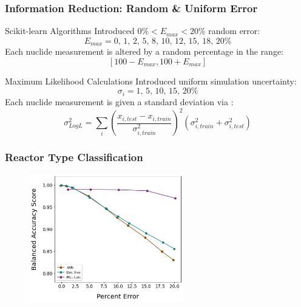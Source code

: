 
\begin{frame}
  \frametitle{Information Reduction: Random \& Uniform Error}
  \begin{block}{Scikit-learn Algorithms}
    \small
    Introduced $0\% < E_{max} < 20\%$ random error:
    \[E_{max} = \text{0, 1, 2, 5, 8, 10, 12, 15, 18, 20}\% \]
    Each nuclide measurement is altered by a random percentage in the range: 
    \[[100-E_{max},100+E_{max}]\]
  \end{block}
  \begin{block}{Maximum Likelihood Calculations}
  \small
    Introduced uniform simulation uncertainty: 
    \[\sigma_i = \text{1, 5, 10, 15, 20}\% \]
    Each nuclide measurement is given a standard deviation via 
    \cite{mll_sensitivity}:
    \[\sigma_{Log L}^2 = \sum_i \left( 
                                \frac{x_{i,test} - x_{i,train}}{\sigma_{i,train}^2}
                                \right)^2 
                                (\sigma_{i,train}^2 + \sigma_{i,test}^2)
    \]
  \end{block}
\end{frame}

\begin{frame}
  \frametitle{Reactor Type Classification}
    \begin{figure}
      \centering
      \includegraphics[width=0.6\textwidth]{./figures/randerr_compare_nuc29_BalAcc_rxtr.png}
    \end{figure}
\end{frame}

